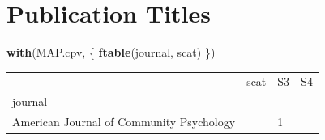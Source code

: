 \documentclass[]{tufte-handout}
\newenvironment{Shaded}{}{}
\newcommand{\KeywordTok}[1]{\textbf{{#1}}}
\newcommand{\NormalTok}[1]{{#1}}
\begin{document}
\section{Publication Titles}\label{publication-titles}

\begin{Shaded}
\begin{Highlighting}[]
\KeywordTok{with}\NormalTok{(MAP.cpv, \{}
    \KeywordTok{ftable}\NormalTok{(journal, scat)}
\NormalTok{\})}
\end{Highlighting}
\end{Shaded}

\begin{longtable}[]{@{}llll@{}}
\toprule
\begin{minipage}[t]{0.53\columnwidth}\raggedright\strut
\strut
\end{minipage} & \begin{minipage}[t]{0.09\columnwidth}\raggedright\strut
scat\strut
\end{minipage} & \begin{minipage}[t]{0.06\columnwidth}\raggedright\strut
S3\strut
\end{minipage} & \begin{minipage}[t]{0.06\columnwidth}\raggedright\strut
S4\strut
\end{minipage}\tabularnewline
\begin{minipage}[t]{0.53\columnwidth}\raggedright\strut
journal\strut
\end{minipage} & \begin{minipage}[t]{0.09\columnwidth}\raggedright\strut
\strut
\end{minipage} & \begin{minipage}[t]{0.06\columnwidth}\raggedright\strut
\strut
\end{minipage} & \begin{minipage}[t]{0.06\columnwidth}\raggedright\strut
\strut
\end{minipage}\tabularnewline
\begin{minipage}[t]{0.53\columnwidth}\raggedright\strut
American Journal of Community Psychology\strut
\end{minipage} & \begin{minipage}[t]{0.09\columnwidth}\raggedright\strut
\strut
\end{minipage} & \begin{minipage}[t]{0.06\columnwidth}\raggedright\strut
1\strut
\end{minipage} & \begin{minipage}[t]{0.06\columnwidth}\raggedright\strut

\end{minipage}
\end{longtable}
\end{document}
